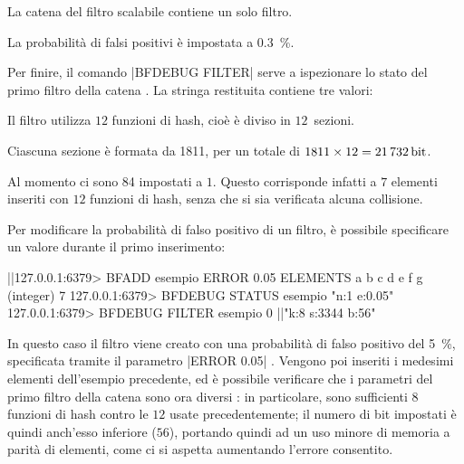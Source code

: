 \begin{description}[labelindent=2\parindent,leftmargin=!,labelwidth=6em,font={\bfseries\ttfamily}]
  \item[n = 1] La catena del filtro scalabile contiene un solo filtro.
  \item[e = 0.003] La probabilità di falsi positivi è impostata a \SI{0.3}{\percent}.
\end{description}

Per finire, il comando \cverb|BFDEBUG FILTER| serve a ispezionare lo stato del primo filtro della
catena . La stringa restituita contiene tre valori:

\begin{description}[labelindent=2\parindent,leftmargin=!,labelwidth=6em,font={\bfseries\ttfamily}]
  \item[k = 12] Il filtro utilizza $12$ funzioni di hash, cioè è diviso in $12$~sezioni.
  \item[s = 1811] Ciascuna sezione è formata da \SI{1811}{\bit}, per un totale di 
      $\num{1811} \times \num{12} = \SI{21732}{\bit}$.
  \item[b = 84] Al momento ci sono \SI{84}{\bit} impostati a $1$. Questo corrisponde infatti a $7$
  elementi inseriti con $12$ funzioni di hash, senza che si sia verificata alcuna collisione.
\end{description}

Per modificare la probabilità di falso positivo di un filtro, è possibile specificare un valore
durante il primo inserimento:

\medskip
\begin{commentedsource}[style=redis,caption=Filtro con probabilità configurata dall'utente]
|\lnote|127.0.0.1:6379> BFADD esempio ERROR 0.05 ELEMENTS a b c d e f g
(integer) 7
127.0.0.1:6379> BFDEBUG STATUS esempio
"n:1 e:0.05"
127.0.0.1:6379> BFDEBUG FILTER esempio 0
|\lnote|"k:8 s:3344 b:56"
\end{commentedsource}

In questo caso il filtro viene creato con una probabilità di falso positivo del \SI{5}{\%},
specificata tramite il parametro \cverb|ERROR 0.05| . Vengono poi inseriti i medesimi
elementi dell'esempio precedente, ed è possibile verificare che i parametri del primo filtro 
della catena sono ora diversi : in particolare, sono sufficienti $8$ funzioni di hash
contro le $12$ usate precedentemente; il numero di bit impostati è quindi anch'esso inferiore
($56$), portando quindi ad un uso minore di memoria a parità di elementi, come ci si aspetta
aumentando l'errore consentito.

